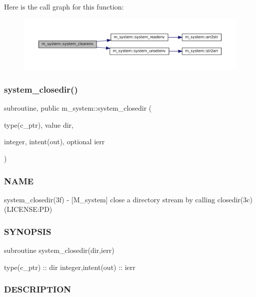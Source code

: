 Here is the call graph for this function\+:
\nopagebreak
\begin{figure}[H]
\begin{center}
\leavevmode
\includegraphics[width=350pt]{namespacem__system_a9c34787b170ab8d41000d7c3acb60736_cgraph}
\end{center}
\end{figure}
\mbox{\label{namespacem__system_acd442b52c64fc50482bc08b0ac8a50d1}} 
\subsubsection{\texorpdfstring{system\+\_\+closedir()}{system\_closedir()}}
{\footnotesize\ttfamily subroutine, public m\+\_\+system\+::system\+\_\+closedir (\begin{DoxyParamCaption}\item[{type(c\+\_\+ptr), value}]{dir,  }\item[{integer, intent(out), optional}]{ierr }\end{DoxyParamCaption})}



\subsubsection*{N\+A\+ME}

system\+\_\+closedir(3f) -\/ \mbox{[}M\+\_\+system\mbox{]} close a directory stream by calling closedir(3c) (L\+I\+C\+E\+N\+SE\+:PD) \subsubsection*{S\+Y\+N\+O\+P\+S\+IS}

subroutine system\+\_\+closedir(dir,ierr)

type(c\+\_\+ptr) \+:\+: dir integer,intent(out) \+:\+: ierr \subsubsection*{D\+E\+S\+C\+R\+I\+P\+T\+I\+ON}

